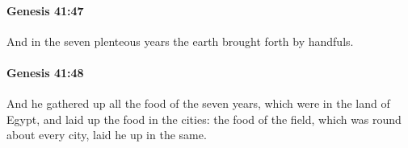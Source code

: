 		\paragraph{Genesis 41:47} %
			\label{GENESIS-41-47}

			And in the seven plenteous years the earth brought forth by handfuls.


		\paragraph{Genesis 41:48} %
			\label{GENESIS-41-48}

			And he gathered up all the food of the seven years, which were in the land of Egypt, and laid up the food in the cities: the food of the field, which was round about every city, laid he up in the same.


